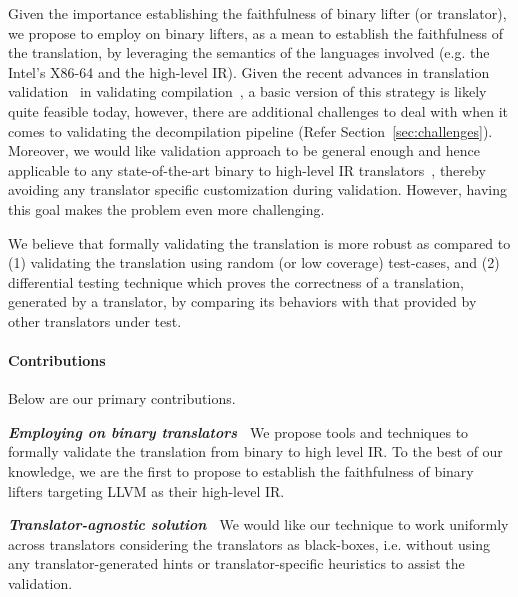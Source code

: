 Given the importance  establishing the faithfulness of
binary lifter (or translator), we propose to employ \tv on binary lifters, as a mean to establish the
faithfulness of the translation, by leveraging the semantics of the languages
involved (e.g. the Intel's X86-64 and the high-level IR).  Given the recent
advances in translation validation~\cite{Pnueli:1998} in validating compilation~\cite{Necula:2000,Pnueli:1998,Stepp:2011,Tristan:2011,VOC2002,TVOC:CAV2005}, a
basic version of this strategy is likely quite feasible today, however, there
are additional challenges to deal with when it comes to validating the
decompilation pipeline (Refer Section~\ref{sec:challenges}). Moreover, we would like validation
approach to be general enough and hence applicable to any state-of-the-art
binary to high-level IR
translators~\cite{McSema:Recon14,Remill,FCD,reopt,llvm-mctoll,BAP:CAV11,Angr1}, thereby
avoiding any translator specific customization during validation.  However,
         having this goal makes the problem even more challenging.

We believe that formally validating the translation is more robust as compared
to (1) validating the translation using random (or low coverage) test-cases,
   and (2) differential testing technique which proves the correctness of a
   translation, generated by a translator, by comparing its behaviors with that
   provided by other translators under test. 

\paragraph{Contributions}
Below are our primary contributions.

\textbf{\emph{Employing \tv on binary translators~}} We propose tools and techniques to
formally validate the translation from binary to high level IR. To the best of
our knowledge, we are the first to propose \tv to establish the
faithfulness of binary lifters targeting LLVM as their high-level IR.

\textbf{\emph{Translator-agnostic solution~}} We would like our technique to work
uniformly across translators considering the translators as black-boxes, i.e. without using any translator-generated hints  or
translator-specific heuristics to assist the validation.

